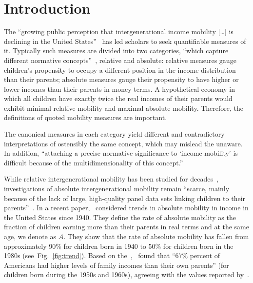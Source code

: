 \documentclass[12pt,a4paper]{article}
\newcommand{\fref}[1]{Fig.~\ref{fig:#1}}
\numberwithin{equation}{section}
\begin{document}
\doublespacing

\section{Introduction} \label{sec:introduction}

The ``growing public perception that intergenerational income mobility [\ldots] is declining in the United States''~\citep[p.~141]{chetty2014united} has led scholars to seek quantifiable measures of it. Typically such measures are divided into two categories, ``which capture different normative concepts''~\citep[p.~1560]{chetty2014land}, relative and absolute: relative measures gauge children's propensity to occupy a different position in the income distribution than their parents; absolute measures gauge their propensity to have higher or lower incomes than their parents in money terms. A hypothetical economy in which all children have exactly twice the real incomes of their parents would exhibit minimal relative mobility and maximal absolute mobility. Therefore, the definitions of quoted mobility measures are important.

The canonical measures in each category yield different and contradictory interpretations of ostensibly the same concept, which may mislead the unaware. In addition, ``attaching a precise normative significance to `income mobility' is difficult because of the multidimensionality of this concept.''~\citep[p.~588]{fields1999measurement}

While relative intergenerational mobility has been studied for decades~\citep{becker1979equilibrium,borjas1992ethnic,piketty2000theories,mazumder2005fortunate,aaronson2008intergenerational,lee2009trends,hauser2010intergenerational,corak2013income,chetty2014united,berman2016understanding}, investigations of absolute intergenerational mobility remain ``scarce, mainly because of the lack of large, high-quality panel data sets linking children to their parents''~\citep[p.~398]{chetty2017fading}. In a recent paper,~\citet{chetty2017fading} considered trends in absolute mobility in income in the United States since 1940. They define the rate of absolute mobility as the fraction of children earning more than their parents in real terms and at the same age, we denote as $A$. They show that the rate of absolute mobility has fallen from approximately 90\% for children born in 1940 to 50\% for children born in the 1980s (see~\fref{trend}). Based on the~\citet{PSID2017},~\citet{isaacs2007economic} found that ``$67\%$ percent of Americans had higher levels of family incomes than their own parents'' (for children born during the 1950s and 1960s), agreeing with the values reported by~\citet{chetty2017fading}.
\end{document}
